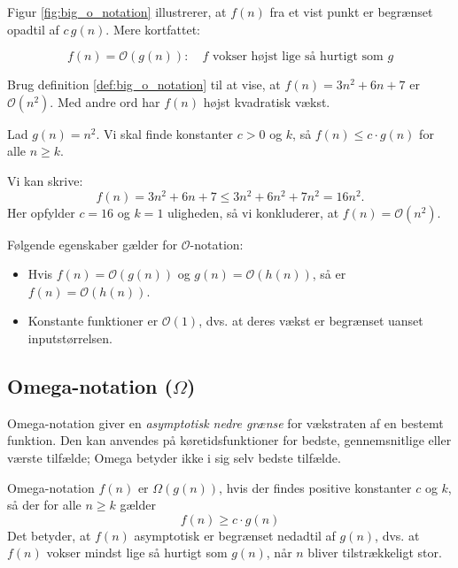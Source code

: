 Figur \ref{fig:big_o_notation} illustrerer, at $f(n)$ fra et vist punkt er begrænset opadtil af $c\,g(n)$. Mere kortfattet:

\[
f(n)=\mathcal{O}(g(n)): \quad f \text{ vokser højst lige så hurtigt som } g
\]


\begin{example}
    Brug definition \ref{def:big_o_notation} til at vise, at $f(n)=3n^2+6n+7$ er $\mathcal{O}(n^2)$. Med andre ord har $f(n)$ højst kvadratisk vækst.
\end{example}

\begin{solution}
    Lad $g(n) = n^2$. Vi skal finde konstanter $c > 0$ og $k$, så $f(n) \leq c \cdot g(n)$ for alle $n \geq k$.
    
    Vi kan skrive:
    \[
    f(n) = 3n^2 + 6n + 7 \leq 3n^2 + 6n^2 + 7n^2 = 16n^2.
    \]
    Her opfylder $c = 16$ og $k = 1$ uligheden, så vi konkluderer, at $f(n) = \mathcal{O}(n^2)$.
\end{solution}

Følgende egenskaber gælder for $\mathcal{O}$-notation:
\begin{itemize}
    \item Hvis $f(n) = \mathcal{O}(g(n))$ og $g(n) = \mathcal{O}(h(n))$, så er $f(n) = \mathcal{O}(h(n))$.
    \item Konstante funktioner er $\mathcal{O}(1)$, dvs. at deres vækst er begrænset uanset inputstørrelsen.
\end{itemize}

\subsection*{Omega-notation (\texorpdfstring{$\Omega$}{Omega})}

Omega-notation giver en \textit{asymptotisk nedre grænse} for vækstraten af en bestemt funktion. Den kan anvendes på køretidsfunktioner for bedste, gennemsnitlige eller værste tilfælde; Omega betyder ikke i sig selv bedste tilfælde. \newpage

\begin{definition}{Omega-notation}\label{def:omega_notation}
    $f(n)$ er $\Omega(g(n))$, hvis der findes positive konstanter $c$ og $k$, så der for alle $n \geq k$ gælder
    \medskip
    \[
    f(n) \geq c \cdot g(n)
    \]
    \medskip
    Det betyder, at $f(n)$ asymptotisk er begrænset nedadtil af $g(n)$, dvs. at $f(n)$ vokser mindst lige så hurtigt som $g(n)$, når $n$ bliver tilstrækkeligt stor.
\end{definition}

